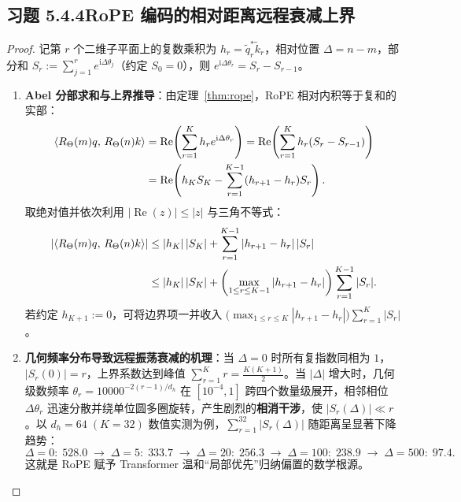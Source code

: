 \subsection*{习题 5.4.4\quad RoPE 编码的相对距离远程衰减上界}
\begin{proof}
记第 $r$ 个二维子平面上的复数乘积为 $h_r = \tilde{q}_r^* \tilde{k}_r$，相对位置 $\Delta = n - m$，部分和 $S_r := \sum_{j=1}^r e^{\mathrm{i}\Delta\theta_j}$（约定 $S_0 = 0$），则 $e^{\mathrm{i}\Delta\theta_r} = S_r - S_{r-1}$。
\begin{enumerate}[label=(\arabic*), leftmargin=1.8em]
  \item \textbf{Abel 分部求和与上界推导}：由定理~\ref{thm:rope}，RoPE 相对内积等于复和的实部：
  \begin{align*}
    \left\langle R_\Theta(m)q,\, R_\Theta(n)k \right\rangle
    &= \operatorname{Re}\!\left(\sum_{r=1}^K h_r e^{\mathrm{i}\Delta\theta_r}\right)
     = \operatorname{Re}\!\left(\sum_{r=1}^K h_r (S_r - S_{r-1})\right) \\
    &= \operatorname{Re}\!\left(h_K S_K - \sum_{r=1}^{K-1} (h_{r+1} - h_r) S_r\right).
  \end{align*}
  取绝对值并依次利用 $|\operatorname{Re}(z)| \le |z|$ 与三角不等式：
  \begin{align*}
    \left|\left\langle R_\Theta(m)q,\, R_\Theta(n)k \right\rangle\right|
    &\le |h_K|\,|S_K| + \sum_{r=1}^{K-1} |h_{r+1} - h_r|\,|S_r| \\
    &\le |h_K|\,|S_K| + \left(\max_{1\le r \le K-1} |h_{r+1} - h_r|\right)\sum_{r=1}^{K-1} |S_r|.
  \end{align*}
  若约定 $h_{K+1} := 0$，可将边界项一并收入 $\big(\max_{1\le r \le K} |h_{r+1} - h_r|\big)\sum_{r=1}^K |S_r|$。

  \item \textbf{几何频率分布导致远程振荡衰减的机理}：当 $\Delta = 0$ 时所有复指数同相为 $1$，$|S_r(0)| = r$，上界系数达到峰值 $\sum_{r=1}^K r = \frac{K(K+1)}{2}$。当 $|\Delta|$ 增大时，几何级数频率 $\theta_r = 10000^{-2(r-1)/d_h}$ 在 $[10^{-4}, 1]$ 跨四个数量级展开，相邻相位 $\Delta\theta_r$ 迅速分散并绕单位圆多圈旋转，产生剧烈的\textbf{相消干涉}，使 $|S_r(\Delta)| \ll r$。以 $d_h = 64\; (K = 32)$ 数值实测为例，$\sum_{r=1}^{32}|S_r(\Delta)|$ 随距离呈显著下降趋势：
  \[
    \Delta=0:\; 528.0 \;\to\;
    \Delta=5:\; 333.7 \;\to\;
    \Delta=20:\; 256.3 \;\to\;
    \Delta=100:\; 238.9 \;\to\;
    \Delta=500:\; 97.4.
  \]
  这就是 RoPE 赋予 Transformer 温和“局部优先”归纳偏置的数学根源。
\end{enumerate}
\end{proof}

